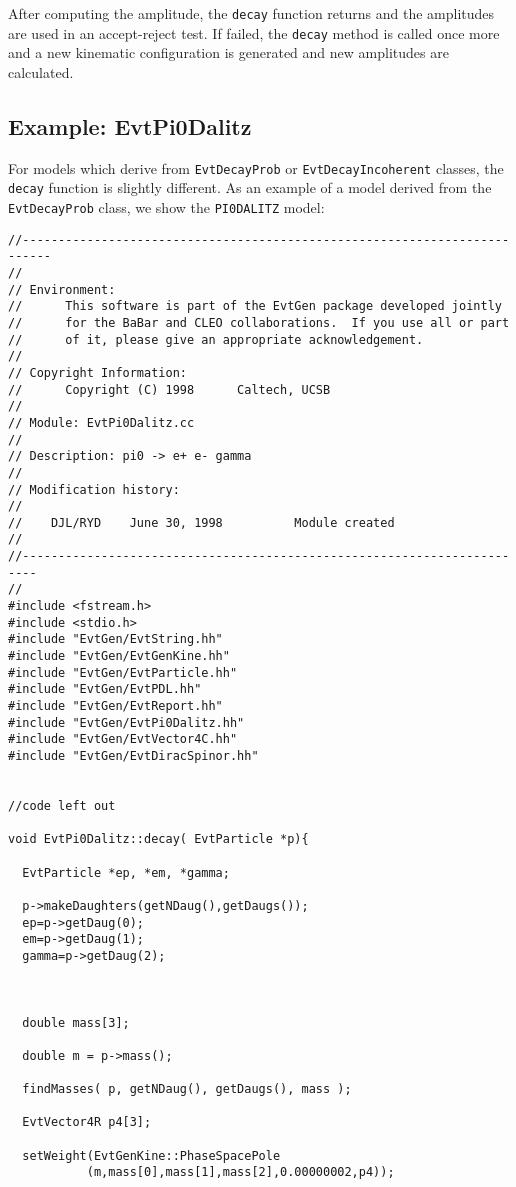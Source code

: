 After computing the amplitude, the {\tt decay} function 
returns and the amplitudes are used in an 
accept-reject test. If failed, the {\tt decay} method is 
called once more and a new kinematic configuration is generated 
and new amplitudes are calculated.

\subsection{Example: EvtPi0Dalitz}

For models which derive from {\tt EvtDecayProb} or
{\tt EvtDecayIncoherent} classes, the {\tt decay} function
is slightly different.  As an example of a model
derived from the {\tt EvtDecayProb} class, we show
the {\tt PI0DALITZ} model:
 
\begin{footnotesize}
\begin{verbatim}
//--------------------------------------------------------------------------
//
// Environment:
//      This software is part of the EvtGen package developed jointly
//      for the BaBar and CLEO collaborations.  If you use all or part
//      of it, please give an appropriate acknowledgement.
//
// Copyright Information:
//      Copyright (C) 1998      Caltech, UCSB
//
// Module: EvtPi0Dalitz.cc
//
// Description: pi0 -> e+ e- gamma 
//
// Modification history:
//
//    DJL/RYD    June 30, 1998          Module created
//
//------------------------------------------------------------------------
//
#include <fstream.h>
#include <stdio.h>
#include "EvtGen/EvtString.hh"
#include "EvtGen/EvtGenKine.hh"
#include "EvtGen/EvtParticle.hh"
#include "EvtGen/EvtPDL.hh"
#include "EvtGen/EvtReport.hh"
#include "EvtGen/EvtPi0Dalitz.hh"
#include "EvtGen/EvtVector4C.hh"
#include "EvtGen/EvtDiracSpinor.hh"


//code left out

void EvtPi0Dalitz::decay( EvtParticle *p){

  EvtParticle *ep, *em, *gamma;
  
  p->makeDaughters(getNDaug(),getDaugs());
  ep=p->getDaug(0);
  em=p->getDaug(1);
  gamma=p->getDaug(2);

 

  double mass[3];
   
  double m = p->mass();
 
  findMasses( p, getNDaug(), getDaugs(), mass );

  EvtVector4R p4[3];

  setWeight(EvtGenKine::PhaseSpacePole
           (m,mass[0],mass[1],mass[2],0.00000002,p4));


\end{verbatim}
\end{footnotesize}
